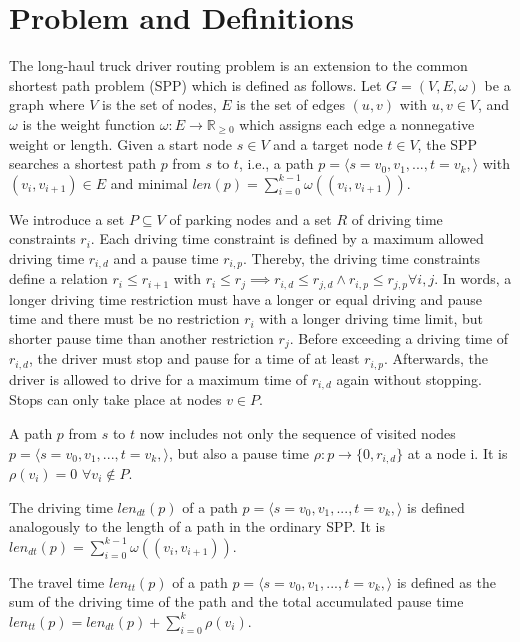 \chapter{Problem and Definitions}
The long-haul truck driver routing problem is an extension to the common shortest path problem (SPP) which is defined as follows. Let $G=(V,E,\omega)$ be a graph where $V$ is the set of nodes, $E$ is the set of edges $(u,v)$ with $u,v \in V$, and $\omega$ is the weight function $\omega: E \rightarrow \mathbb{R}_{\ge 0}$ which assigns each edge a nonnegative weight or length. Given a start node $s \in V$ and a target node $t \in V$, the SPP searches a shortest path $p$ from $s$ to $t$, i.e., a path $p = \langle s=v_0,v_1,...,t=v_k, \rangle$ with $(v_i,v_{i+1}) \in E$ and minimal $len(p) = \sum_{i=0}^{k-1} \omega((v_{i}, v_{i+1}))$.

We introduce a set $P \subseteq V$ of parking nodes and a set $R$ of driving time constraints $r_i$. Each driving time constraint is defined by a maximum allowed driving time $r_{i,d}$ and a pause time $r_{i,p}$. Thereby, the driving time constraints define a relation $r_i \le r_{i+1}$ with $r_i \le r_j \implies r_{i,d} \le r_{j,d} \land  r_{i,p} \le r_{j,p} \forall i,j$. In words, a longer driving time restriction must have a longer or equal driving and pause time and there must be no restriction $r_i$ with a longer driving time limit, but shorter pause time than another restriction $r_j$. Before exceeding a driving time of $r_{i,d}$, the driver must stop and pause for a time of at least $r_{i,p}$. Afterwards, the driver is allowed to drive for a maximum time of $r_{i,d}$ again without stopping. Stops can only take place at nodes $v \in P$.

A path $p$ from $s$ to $t$ now includes not only the sequence of visited nodes $p = \langle s=v_0,v_1,...,t=v_k, \rangle$, but also a pause time $\rho: p \rightarrow \{0,r_{i,d}\}$ at a node i. It is $\rho(v_i) = 0$ $\forall v_i \notin P$.

\begin{definition}
	The driving time $len_{dt}(p)$ of a path  $p = \langle s=v_0,v_1,...,t=v_k, \rangle$ is defined analogously to the length of a path in the ordinary SPP. It is $len_{dt}(p) = \sum_{i=0}^{k-1} \omega((v_{i}, v_{i+1}))$.
\end{definition}

\begin{definition}
	The travel time $len_{tt}(p)$ of a path  $p = \langle s=v_0,v_1,...,t=v_k, \rangle$ is defined as the sum of the driving time of the path and the total accumulated pause time $len_{tt}(p) = len_{dt}(p) + \sum_{i=0}^{k} \rho(v_i)$.
\end{definition}

